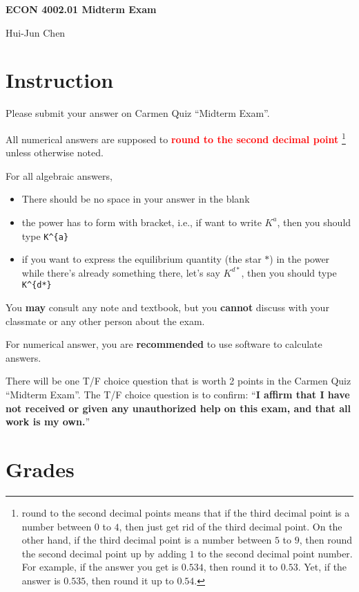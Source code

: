 \documentclass[14pt]{extarticle}
\newcommand{\red}[1]{\textcolor{red}{#1}}
\newcommand{\showAns}{\setboolean{showAns}{true}}
\begin{document}
\centerline{\huge\bf ECON 4002.01 Midterm Exam}
\smallskip
\centerline{\LARGE Hui-Jun Chen}

\medskip

\showAns
\listofanswer

\section*{Instruction}
\label{sec:Instruction}
Please submit your answer on Carmen Quiz ``Midterm Exam''.

All numerical answers are supposed to \red{\textbf{round to the second decimal point}}%
\footnote{round to the second decimal points means that if the third decimal point is a number between $ 0 $ to $ 4 $, then just get rid of the third decimal point. On the other hand, if the third decimal point is a number between $ 5 $ to $ 9 $, then round the second decimal point up by adding $ 1 $ to the second decimal point number. For example, if the answer you get is $ 0.534 $, then round it to $ 0.53 $. Yet, if the answer is $ 0.535 $, then round it up to $ 0.54 $.}
unless otherwise noted.

For all algebraic answers,
\begin{itemize}
    \item There should be no space in your answer in the blank
    \item the power has to form with bracket, i.e., if want to write $ K^{a} $, then you should type \verb|K^{a}|
    \item if you want to express the equilibrium quantity (the star $ * $) in the power while there's already something there, let's say $ K^{d*} $, then you should type \verb|K^{d*}|
\end{itemize}

You \textbf{may} consult any note and textbook, but you \textbf{cannot} discuss with your classmate or any other person about the exam.

For numerical answer, you are \textbf{recommended} to use software to calculate answers.

There will be one T/F choice question that is worth 2 points in the Carmen Quiz ``Midterm Exam''. The T/F choice question is to confirm: ``\textbf{I affirm that I have not received or given any unauthorized help on this exam, and that all work is my own.}''

\section*{Grades}
\label{sec:Grades}
\end{document}
